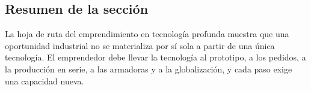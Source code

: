 \subsection{Resumen de la sección}

La hoja de ruta del emprendimiento en tecnología profunda muestra que una oportunidad industrial no se materializa por sí sola a partir de una única tecnología. El emprendedor debe llevar la tecnología al prototipo, a los pedidos, a la producción en serie, a las armadoras y a la globalización, y cada paso exige una capacidad nueva.
